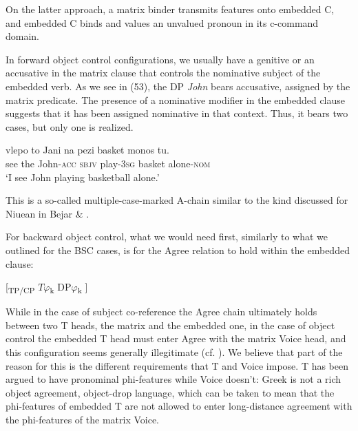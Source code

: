 \documentclass[output=paper]{langsci/langscibook}
\begin{document}
On the latter approach, a matrix binder transmits features onto embedded C, and embedded C binds and values an unvalued pronoun in its c-command domain.

In forward object control configurations, we usually have a genitive or an accusative in the matrix clause that controls the nominative subject of the embedded verb. As we see in (53), the DP \textit{John} bears accusative, assigned by the matrix predicate. The presence of a nominative modifier in the embedded clause suggests that it has been assigned nominative in that context. Thus, it bears two cases, but only one is realized.

\ea%
    \label{ex:alexiadou:53}
    \gll vlepo to    Jani        na   pezi        basket  monos tu.\\
         see     the John-\textsc{acc} \textsc{sbjv} play-\textsc{3sg} basket  alone-\textsc{nom}\\
    \glt ‘I see John playing basketball alone.’
    \z

This is a so-called multiple-case-marked A-chain similar to the kind discussed for Niuean in Bejar \& \citet[67]{Massam1999}.

For backward object control, what we would need first, similarly to what we outlined for the BSC cases, is for the Agree relation to hold within the embedded clause:

\ea%
    \label{ex:alexiadou:54}
    \textsubscript{} [\textsubscript{TP/CP}    $T\varphi $\textsubscript{k}    DP$\varphi $\textsubscript{k}  ]  
\z
 
While in the case of subject co-reference the Agree chain ultimately holds between two T heads, the matrix and the embedded one, in the case of object control the embedded T head must enter Agree with the matrix Voice head, and this configuration seems generally illegitimate (cf. \citealt{Kayne1989}). We believe that part of the reason for this is the different requirements that T and Voice impose. T has been argued to have pronominal phi-features while Voice doesn’t: Greek is not a rich object agreement, object-drop language, which can be taken to mean that the phi-features of embedded T are not allowed to enter long-distance agreement with the phi-features of the matrix Voice. 
\end{document}
